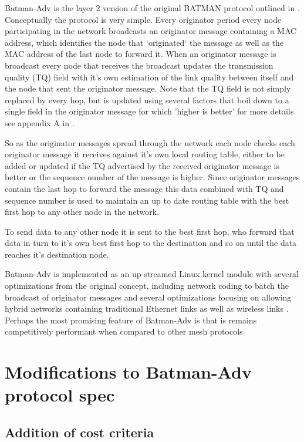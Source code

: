 \documentclass[11pt]{article}
\begin{document}
    Batman-Adv is the layer 2 version of the original BATMAN protocol outlined in \cite{batman}. Conceptually the protocol is very simple. Every originator period every node participating in the network broadcasts an originator message containing a MAC address, which identifies the node that `originated` the message as well as the MAC address of the last node to forward it.  When an originator message is broadcast every node that receives the broadcast updates the transmission quality (TQ) field with it's own estimation of the link quality between itself and the node that sent the originator message. Note that the TQ field is not simply replaced by every hop, but is updated using several factors that boil down to a single field in the originator message for which 'higher is better' for more details see appendix A in \cite{batroam}.
    
    So as the originator messages spread through the network each node checks each originator message it receives against it's own local routing table, either to be added or updated if the TQ advertised by the received originator message is better or the sequence number of the message is higher. Since originator messages contain the last hop to forward the message this data combined with TQ and sequence number is used to maintain an up to date routing table with the best first hop to any other node in the network.
    
    To send data to any other node it is sent to the best first hop, who forward that data in turn to it's own best first hop to the destination and so on until the data reaches it's destination node.
    
    Batman-Adv is implemented as an up-streamed Linux kernel module with several optimizations from the original concept, including network coding to batch the broadcast of originator messages and several optimizations focusing on allowing hybrid networks containing traditional Ethernet links as well as wireless links \cite{catwoman}. Perhaps the most promising feature of Batman-Adv is that is remains competitively performant when compared to other mesh protocols \cite{meshperf}


\section{Modifications to Batman-Adv protocol spec}

	\subsection{Addition of cost criteria} \label{cost}
\end{document}
